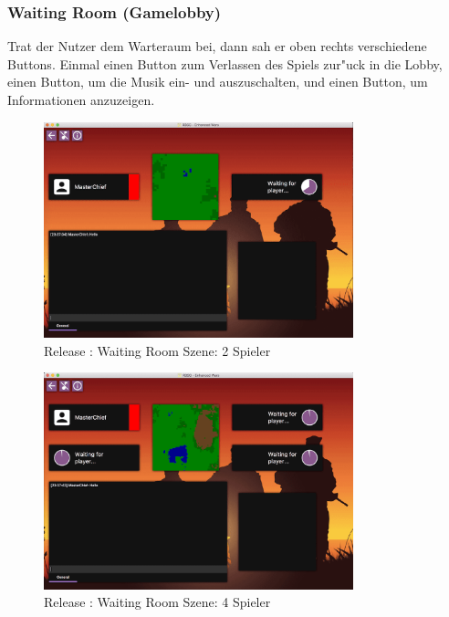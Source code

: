 \documentclass[12pt, titlepage]{scrartcl}
\newcommand{\RN}[1]{%
	\textup{\uppercase\expandafter{\romannumeral#1}}%
}
\begin{document}
	        \subsubsection{Waiting Room (Gamelobby)} \label{WAITING_ROOM}
                Trat der Nutzer dem Warteraum bei, dann sah er oben rechts verschiedene Buttons. Einmal einen Button zum Verlassen des Spiels zur"uck in die Lobby, einen Button, um die Musik ein- und auszuschalten, und einen Button, um Informationen anzuzeigen. \\
                \begin{figure}[H] 
    				\centering
    				\includegraphics[width=0.8\textwidth]{images/old_state/waiting_room/2Player.png}
    				\caption{Release \RN{2}: Waiting Room Szene: 2 Spieler}
    				\label{Waiting_Room_2}
			    \end{figure}
			    \begin{figure}[H] 
    				\centering
    				\includegraphics[width=0.8\textwidth]{images/old_state/waiting_room/4Player.png}
    				\caption{Release \RN{2}: Waiting Room Szene: 4 Spieler}
    				\label{Waiting_Room_4}
			    \end{figure}
\end{document}
